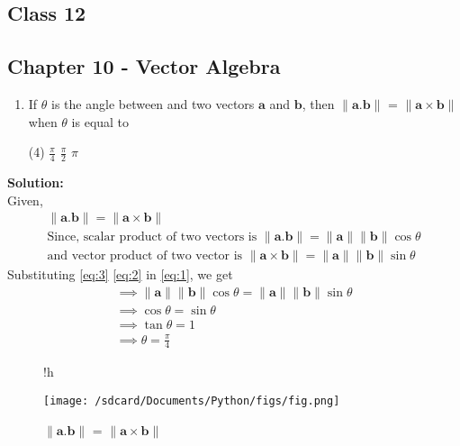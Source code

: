 \documentclass{article}
\newcommand{\norm}[1]{\lVert#1\rVert}
\renewcommand{\vec}[1]{\textbf{#1}}
\begin{document}
\onehalfspacing
\begin{center}
  \section*{\textbf{Class 12}}
  \subsection*{Chapter 10 - Vector Algebra}
\end{center}
\begin{enumerate}
	\item If $\theta$ is the angle between and two vectors $\vec{a}$ and $\vec{b}$, then $\norm{\vec{a}.\vec{b}}$ = $\norm{\vec{a}\times\vec{b}}$ when $\theta$ is equal to
    \begin{tasks}(4)
      \task $\frac{\pi}{4}$
      \task $\frac{\pi}{2}$
      \task $\pi$
      \end{tasks}
\end{enumerate}
  \textbf{Solution:}
  \\
Given,
\begin{align}
  \norm{\vec{a}.\vec{b}}=\norm{\vec{a} \times \vec{b}} \label{eq:1}
  \\
  \text{Since, scalar product of two vectors is } \norm{\vec{a}.\vec{b}} = \norm{\vec{a}}\norm{\vec{b}}\cos{\theta} \label{eq:2}
  \\
  \text{and vector product of two vector is }\norm{\vec{a} \times \vec{b}} = \norm{\vec{a}}\norm{\vec{b}}\sin{\theta} \label{eq:3}
\end{align}
Substituting \eqref{eq:3} \eqref{eq:2} in \eqref{eq:1}, we get
\\
\begin{align}
  \implies \norm{\vec{a}}\norm{\vec{b}}\cos{\theta} = \norm{\vec{a}}\norm{\vec{b}}\sin{\theta}\\
  \implies \cos{\theta} = \sin{\theta}\\
  \implies \tan{\theta} = 1\\
  \implies \theta = \frac{\pi}{4}
\end{align}
\begin{figure}{!h}
	\begin{center}
		\texttt{[image: /sdcard/Documents/Python/figs/fig.png]}
	\end{center}
	\caption{$\norm{\vec{a}.\vec{b}}$ = $\norm{\vec{a}\times\vec{b}}$}
	\label{fig:12.10.5.19}
\end{figure}
\end{document}
